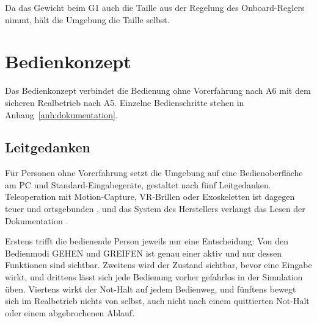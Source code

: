 Da das Gewicht beim G1 auch die Taille aus der Regelung des Onboard-Reglers nimmt, hält die Umgebung die Taille selbst.

\section{Bedienkonzept}
\label{sec:bedienkonzept}
Das Bedienkonzept verbindet die Bedienung ohne Vorerfahrung nach A6 mit dem sicheren Realbetrieb nach A5.
Einzelne Bedienschritte stehen in Anhang~\ref{anh:dokumentation}.

\subsection{Leitgedanken}
\label{sec:leitgedanken}
Für Personen ohne Vorerfahrung setzt die Umgebung auf eine Bedienoberfläche am PC und Standard-Eingabegeräte, gestaltet nach fünf Leitgedanken.
Teleoperation mit Motion-Capture, VR-Brillen oder Exoskeletten ist dagegen teuer und ortsgebunden \cite{Fu2024}, und das System des Herstellers verlangt das Lesen der Dokumentation \cite{UnitreeXRTeleop}.

Erstens trifft die bedienende Person jeweils nur eine Entscheidung: Von den Bedienmodi GEHEN und GREIFEN ist genau einer aktiv und nur dessen Funktionen sind sichtbar.
Zweitens wird der Zustand sichtbar, bevor eine Eingabe wirkt, und drittens lässt sich jede Bedienung vorher gefahrlos in der Simulation üben.
Viertens wirkt der Not-Halt auf jedem Bedienweg, und fünftens bewegt sich im Realbetrieb nichts von selbst, auch nicht nach einem quittierten Not-Halt oder einem abgebrochenen Ablauf.

